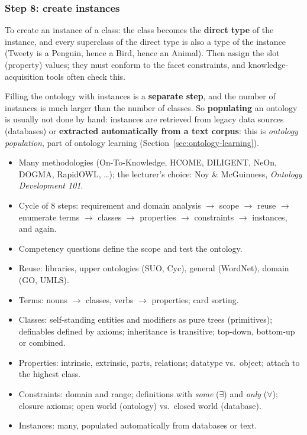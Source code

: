 \subsubsection{Step 8: create instances}

To create an instance of a class: the class becomes the \textbf{direct type} of the
instance, and every superclass of the direct type is also a type of the instance (Tweety
is a Penguin, hence a Bird, hence an Animal). Then assign the slot (property) values;
they must conform to the facet constraints, and knowledge-acquisition tools often check
this.

Filling the ontology with instances is a \textbf{separate step}, and the number of
instances is much larger than the number of classes. So \textbf{populating} an ontology
is usually not done by hand: instances are retrieved from legacy data sources
(databases) or \textbf{extracted automatically from a text corpus}: this is
\emph{ontology population}, part of ontology learning (Section~\ref{sec:ontology-learning}).

\begin{nbsummary}
\begin{itemize}[nosep]
  \item Many methodologies (On-To-Knowledge, HCOME, DILIGENT, NeOn, DOGMA, RapidOWL,
        \ldots); the lecturer's choice: Noy \& McGuinness, \emph{Ontology Development
        101}.
  \item Cycle of 8 steps: requirement and domain analysis $\to$ scope $\to$ reuse $\to$
        enumerate terms $\to$ classes $\to$ properties $\to$ constraints $\to$
        instances, and again.
  \item Competency questions define the scope and test the ontology.
  \item Reuse: libraries, upper ontologies (SUO, Cyc), general (WordNet), domain (GO,
        UMLS).
  \item Terms: nouns $\to$ classes, verbs $\to$ properties; card sorting.
  \item Classes: self-standing entities and modifiers as pure trees (primitives);
        definables defined by axioms; inheritance is transitive; top-down, bottom-up or
        combined.
  \item Properties: intrinsic, extrinsic, parts, relations; datatype vs.\ object; attach
        to the highest class.
  \item Constraints: domain and range; definitions with \emph{some} ($\exists$) and
        \emph{only} ($\forall$); closure axioms; open world (ontology) vs.\ closed world
        (database).
  \item Instances: many, populated automatically from databases or text.
\end{itemize}
\end{nbsummary}
